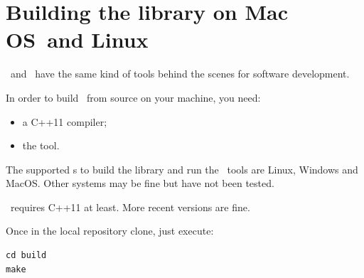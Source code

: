 \section{Building the library on Mac OS\texttrademark\ and Linux}

\MacOS\ and \Linux\ have the same kind of tools behind the scenes for software development.

In order to build \mf\ from source on your machine, you need:
\begin{itemize}
\item a C++11 compiler;
\item the  tool.
\end{itemize}

The supported \OS s to build the library and run the \CLI\ tools are Linux, Windows and MacOS. Other systems may be fine but have not been tested.

\mf\ requires C++11 at least. More recent versions are fine.

Once in the local repository clone, just execute:
\begin{lstlisting}[language=Terminal]
cd build
make
\end{lstlisting}

